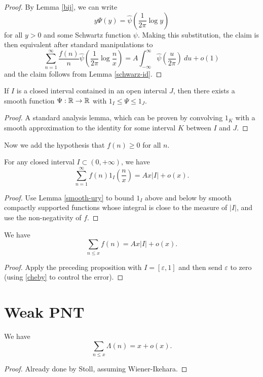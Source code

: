 \begin{proof}
 By Lemma \ref{bij}, we can write
$$ y \Psi(y) = \hat \psi( \frac{1}{2\pi} \log y )$$
for all $y>0$ and some Schwartz function $\psi$.  Making this substitution, the claim is then equivalent after standard manipulations to
$$ \sum_{n=1}^\infty \frac{f(n)}{n} \hat \psi( \frac{1}{2\pi} \log \frac{n}{x} ) = A \int_{-\infty}^\infty \hat \psi(\frac{u}{2\pi})\ du + o(1)$$
and the claim follows from Lemma \ref{schwarz-id}.
\end{proof}



\begin{lemma}\label{smooth-ury}  If $I$ is a closed interval contained in an open interval $J$, then there exists a smooth function $\Psi: \R \to \R$ with $1_I \leq \Psi \leq 1_J$.
\end{lemma}



\begin{proof}  A standard analysis lemma, which can be proven by convolving $1_K$ with a smooth approximation to the identity for some interval $K$ between $I$ and $J$.
\end{proof}



Now we add the hypothesis that $f(n) \geq 0$ for all $n$.

\begin{proposition}
\label{WienerIkeharaInterval}
  For any closed interval $I \subset (0,+\infty)$, we have
  $$ \sum_{n=1}^\infty f(n) 1_I( \frac{n}{x} ) = A x |I|  + o(x).$$
\end{proposition}



\begin{proof}
  Use Lemma \ref{smooth-ury} to bound $1_I$ above and below by smooth compactly supported functions whose integral is close to the measure of $|I|$, and use the non-negativity of $f$.
\end{proof}



\begin{corollary}\label{WienerIkehara}
  We have
$$ \sum_{n\leq x} f(n) = A x |I|  + o(x).$$
\end{corollary}



\begin{proof}
  Apply the preceding proposition with $I = [\varepsilon,1]$ and then send $\varepsilon$ to zero (using \eqref{cheby} to control the error).
\end{proof}



\section{Weak PNT}

\begin{theorem}\label{WeakPNT}  We have
$$ \sum_{n \leq x} \Lambda(n) = x + o(x).$$
\end{theorem}



\begin{proof}
  Already done by Stoll, assuming Wiener-Ikehara.
\end{proof}


